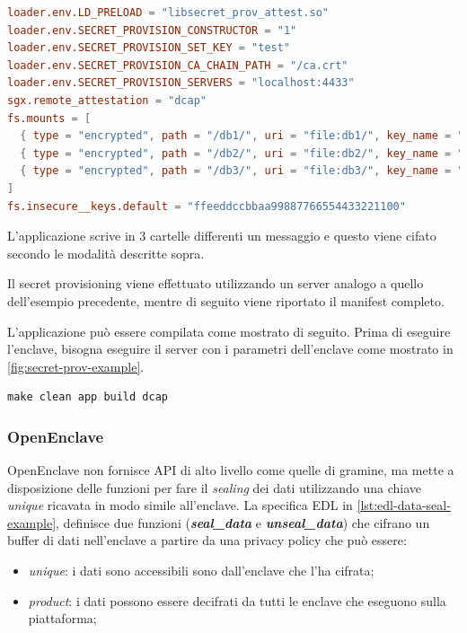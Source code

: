 \documentclass{article}
\begin{document}
\begin{lstlisting}[language=toml,caption=Cartelle cifrate con differenti modalità,label=lst:gramine-data-sealing]
loader.env.LD_PRELOAD = "libsecret_prov_attest.so"
loader.env.SECRET_PROVISION_CONSTRUCTOR = "1"
loader.env.SECRET_PROVISION_SET_KEY = "test"
loader.env.SECRET_PROVISION_CA_CHAIN_PATH = "/ca.crt"
loader.env.SECRET_PROVISION_SERVERS = "localhost:4433"
sgx.remote_attestation = "dcap"
fs.mounts = [
  { type = "encrypted", path = "/db1/", uri = "file:db1/", key_name = "default" },
  { type = "encrypted", path = "/db2/", uri = "file:db2/", key_name = "_sgx_mrenclave" },
  { type = "encrypted", path = "/db3/", uri = "file:db3/", key_name = "test" },
]
fs.insecure__keys.default = "ffeeddccbbaa99887766554433221100"
\end{lstlisting}
L'applicazione scrive in $3$ cartelle differenti un messaggio e questo viene cifato secondo le modalità descritte sopra. 



Il secret provisioning viene effettuato utilizzando un server analogo a quello dell'esempio precedente, mentre di seguito viene riportato il manifest completo.



L'applicazione può essere compilata come mostrato di seguito. Prima di eseguire l'enclave, bisogna eseguire il server con i parametri dell'enclave come mostrato in \cref{fig:secret-prov-example}.
\begin{verbatim}
make clean app build dcap 
\end{verbatim}

\subsubsection{OpenEnclave}
OpenEnclave non fornisce API di alto livello come quelle di gramine, ma mette a disposizione delle funzioni per fare il \textit{sealing} dei dati utilizzando una chiave \textit{unique} ricavata in modo simile all'enclave. La specifica EDL in \cref{lst:edl-data-seal-example}, definisce due funzioni (\textbf{\textit{seal\_data}} e \textbf{\textit{unseal\_data}}) che cifrano un buffer di dati nell'enclave a partire da una privacy policy che può essere:
\begin{itemize}
  \item \textit{unique}: i dati sono accessibili sono dall'enclave che l'ha cifrata;
  \item \textit{product}: i dati possono essere decifrati da tutti le enclave che eseguono sulla piattaforma;
\end{itemize}
\end{document}
